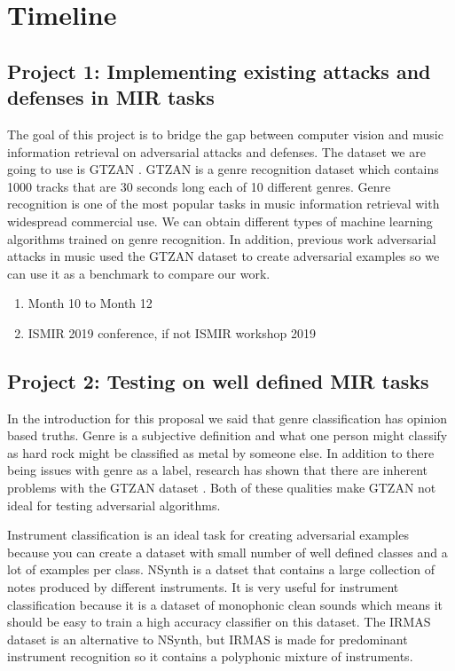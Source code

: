 \documentclass[journal,onecolumn]{IEEEtran}
\begin{document}
\section{Timeline}

\subsection{Project 1: Implementing existing attacks and defenses in MIR tasks}
The goal of this project is to bridge the gap between computer vision and music information retrieval on adversarial attacks and defenses. The dataset we are going to use is GTZAN  . GTZAN is a genre recognition dataset which contains 1000 tracks that are 30 seconds long each of 10 different genres. Genre recognition is one of the most popular tasks in music information retrieval with widespread commercial use. We can obtain different types of machine learning algorithms trained on genre recognition. In addition, previous work adversarial attacks in music used the GTZAN dataset to create adversarial examples \cite{kereliuk_deep_2015} so we can use it as a benchmark to compare our work. 

\begin{enumerate}
\item Month 10 to Month 12
\item ISMIR 2019 conference, if not ISMIR workshop 2019
\end{enumerate}
\subsection{Project 2: Testing on well defined MIR tasks}
In the introduction for this proposal we said that genre classification has opinion based truths. Genre is a subjective definition and what one person might classify as hard rock might be classified as metal by someone else. In addition to there being issues with genre as a label, research has shown that there are inherent problems with the GTZAN dataset \cite{}. Both of these qualities make GTZAN not ideal for testing adversarial algorithms. 

Instrument classification is an ideal task for creating adversarial examples because you can create a dataset with small number of well defined classes and a lot of examples per class.  NSynth \cite{nsynth2017} is a datset that contains a large collection of notes produced by different instruments. It is very useful for instrument classification because it is a dataset of monophonic clean sounds which means it should be easy to train a high accuracy classifier on this dataset. The IRMAS \cite{bosch2012comparison} dataset is an alternative to NSynth, but IRMAS is made for predominant instrument recognition so it contains a polyphonic mixture of instruments.
\end{document}
